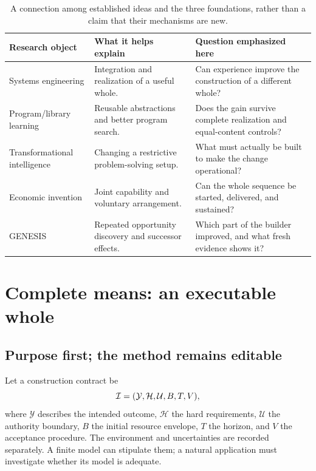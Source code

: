 \begin{table}[htbp]
\centering\small
\begin{tabularx}{\linewidth}{@{}P{1.31in}YY@{}}
\toprule
\textbf{Research object} & \textbf{What it helps explain} & \textbf{Question emphasized here}\\
\midrule
Systems engineering & Integration and realization of a useful whole. & Can experience improve the construction of a different whole?\\
Program/library learning & Reusable abstractions and better program search. & Does the gain survive complete realization and equal-content controls?\\
Transformational intelligence & Changing a restrictive problem-solving setup. & What must actually be built to make the change operational?\\
Economic invention & Joint capability and voluntary arrangement. & Can the whole sequence be started, delivered, and sustained?\\
GENESIS & Repeated opportunity discovery and successor effects. & Which part of the builder improved, and what fresh evidence shows it?\\
\bottomrule
\end{tabularx}
\caption{A connection among established ideas and the three foundations, rather than a claim that their mechanisms are new.}
\end{table}

\section{Complete means: an executable whole}
\label{sec:means}

\subsection{Purpose first; the method remains editable}

Let a construction contract be
\begin{equation}
\mathcal{I}=(\mathcal Y,\mathcal H,\mathcal U,B,T,V),
\label{eq:contract}
\end{equation}
where $\mathcal Y$ describes the intended outcome, $\mathcal H$ the hard requirements, $\mathcal U$ the authority boundary, $B$ the initial resource envelope, $T$ the horizon, and $V$ the acceptance procedure. The environment and uncertainties are recorded separately. A finite model can stipulate them; a natural application must investigate whether its model is adequate.

